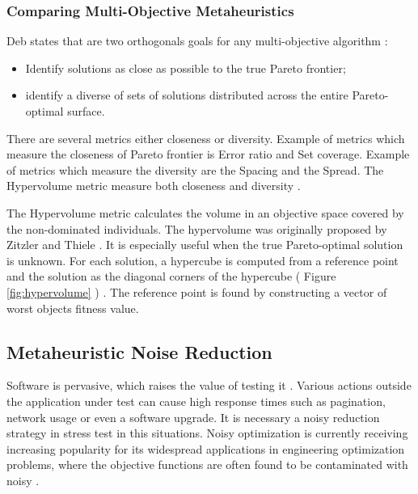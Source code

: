 \documentclass[espaco=umemeio,chapter=TITLE,twoside,openright]{abnt}
\begin{document}
\subsubsection{Comparing Multi-Objective Metaheuristics}

Deb states that are two orthogonals goals for any multi-objective algorithm \cite{deb2001multi}:

\begin{itemize}
\item Identify solutions as close as possible  to the true Pareto frontier;
\item identify a diverse of sets of solutions distributed across the entire Pareto-optimal surface.
\end{itemize}

There are several metrics either closeness or diversity. Example of metrics which measure the closeness of Pareto frontier is Error ratio and Set coverage. Example of metrics which measure the diversity are the Spacing and the Spread. The Hypervolume metric measure both closeness and diversity \cite{janssens2010multiple}.

The Hypervolume metric calculates the volume in an objective space covered by the non-dominated individuals. The hypervolume was originally proposed by Zitzler and Thiele \cite{Zitzler1999}. It is especially useful when the true Pareto-optimal solution is unknown. For each solution, a hypercube is computed from a reference point and the solution as the diagonal corners of the hypercube ( Figure \ref{fig:hypervolume} ) \cite{janssens2010multiple}. The reference point is found by constructing a vector of worst objects fitness value.






\subsection{Metaheuristic Noise Reduction}

Software is pervasive, which raises the value of testing it \cite{Sandler2004}. Various actions outside the application under test can cause high response times such as pagination, network usage or even a software upgrade. It is necessary a noisy reduction strategy in stress test in this situations. Noisy optimization is currently receiving increasing popularity for its widespread applications in engineering optimization
problems, where the objective functions are often found to be contaminated with noisy \cite{Rakshit2017}. 
\end{document}
